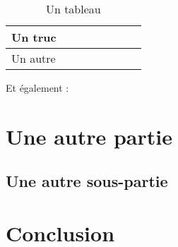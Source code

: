 \documentclass[a4paper,12pt,french]{article}
\begin{document}
\begin{table}[!ht]
\begin{center}
\begin{tabular}{@{}llllllll@{}}
\toprule
Un truc &  &  &  &  &  &  &  \\ \midrule
Un autre &  &  &  &  &  &  & \\ \bottomrule
\end{tabular}
\caption{Un tableau \label{tab:id-de-la-table}}
\end{center}
\end{table}



Et également :




\section{Une autre partie}
\subsection{Une autre sous-partie}
\lipsum[2]




\section{Conclusion}
\lipsum[1]


%
%



\newpage
\thispagestyle{empty}
\end{document}
